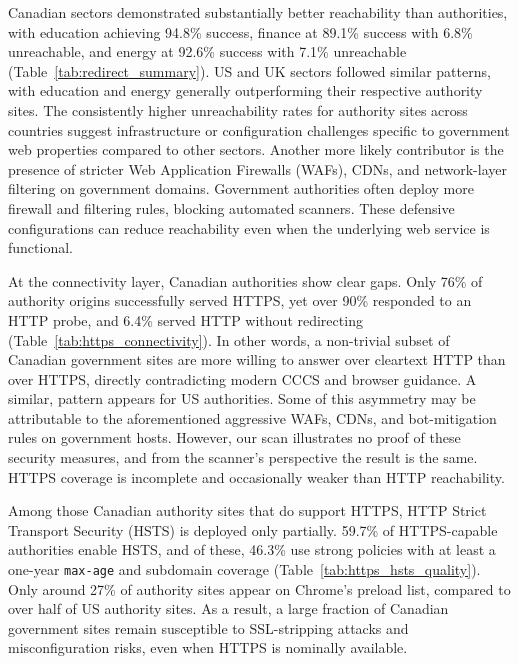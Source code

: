 \documentclass[pdflatex,sn-mathphys-num]{sn-jnl}
\numberwithin{equation}{section}
\theoremstyle{thmstyleone}
\theoremstyle{thmstyletwo}%
\theoremstyle{thmstylethree}%
\begin{document}
\vspace{1em}Canadian sectors demonstrated substantially better reachability than authorities, 
with education achieving 94.8\% success, finance at 
89.1\% success with 6.8\% unreachable, and energy at 92.6\% success with 7.1\% 
unreachable (Table~\ref{tab:redirect_summary}). US and UK sectors followed similar patterns, with education and energy 
generally outperforming their respective authority sites. The consistently higher 
unreachability rates for authority sites across countries suggest infrastructure or 
configuration challenges specific to government web properties compared to other sectors. 
Another more likely contributor is the presence of stricter 
Web Application Firewalls (WAFs), CDNs, and network-layer filtering on government domains. 
Government authorities often deploy more firewall and filtering rules, blocking 
automated scanners. These defensive configurations can reduce reachability even when the underlying web service is 
functional.

\vspace{1em}At the connectivity layer, Canadian authorities show clear gaps. Only 76\% of authority origins 
successfully served HTTPS, yet over 90\% responded to an HTTP probe, and 6.4\% served HTTP without redirecting (Table~\ref{tab:https_connectivity}). 
In other words, a non-trivial subset of Canadian government sites are more willing to answer over cleartext HTTP 
than over HTTPS, directly contradicting modern CCCS and browser guidance. A similar, pattern appears for US authorities. 
Some of this asymmetry may be attributable to the aforementioned aggressive WAFs, 
CDNs, and bot-mitigation rules on government hosts. However, our scan illustrates no proof of these security measures, 
and from the scanner's perspective the result is the same. 
HTTPS coverage is incomplete and occasionally weaker than HTTP reachability.

\vspace{1em}Among those Canadian authority sites that do support HTTPS, HTTP Strict Transport Security (HSTS) 
is deployed only partially. 59.7\% of HTTPS-capable authorities enable HSTS, and of these, 46.3\% use strong 
policies with at least a one-year \texttt{max-age} and subdomain coverage (Table~\ref{tab:https_hsts_quality}). 
Only around 27\% of authority 
sites appear on Chrome’s preload list, compared to over half of US authority sites. As a result, a large 
fraction of Canadian government sites remain susceptible to SSL-stripping attacks and misconfiguration risks, 
even when HTTPS is nominally available.
\end{document}
